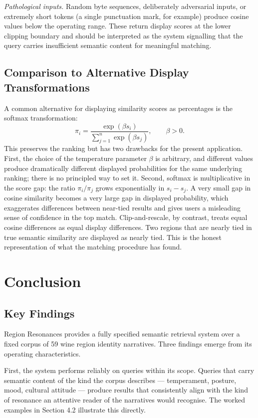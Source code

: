 \documentclass[11pt]{article}
\begin{document}
\textit{Pathological inputs.} Random byte sequences, deliberately adversarial inputs, or extremely short tokens (a single punctuation mark, for example) produce cosine values below the operating range. These return display scores at the lower clipping boundary and should be interpreted as the system signalling that the query carries insufficient semantic content for meaningful matching.

\subsection{Comparison to Alternative Display Transformations}
A common alternative for displaying similarity scores as percentages is the softmax transformation:
\[
\pi_i = \frac{\exp(\beta s_i)}{\sum_{j=1}^{n} \exp(\beta s_j)}, \qquad \beta > 0.
\]
This preserves the ranking but has two drawbacks for the present application. First, the choice of the temperature parameter $\beta$ is arbitrary, and different values produce dramatically different displayed probabilities for the same underlying ranking; there is no principled way to set it. Second, softmax is multiplicative in the score gap: the ratio $\pi_i / \pi_j$ grows exponentially in $s_i - s_j$. A very small gap in cosine similarity becomes a very large gap in displayed probability, which exaggerates differences between near-tied results and gives users a misleading sense of confidence in the top match. Clip-and-rescale, by contrast, treats equal cosine differences as equal display differences. Two regions that are nearly tied in true semantic similarity are displayed as nearly tied. This is the honest representation of what the matching procedure has found.

\section{Conclusion}

\subsection{Key Findings}
Region Resonances provides a fully specified semantic retrieval system over a fixed corpus of 59 wine region identity narratives. Three findings emerge from its operating characteristics.

First, the system performs reliably on queries within its scope. Queries that carry semantic content of the kind the corpus describes --- temperament, posture, mood, cultural attitude --- produce results that consistently align with the kind of resonance an attentive reader of the narratives would recognise. The worked examples in Section 4.2 illustrate this directly.
\end{document}
